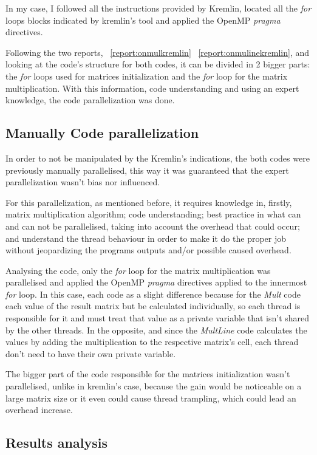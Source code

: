 In my case, I followed all the instructions provided by Kremlin, located all the \textit{for} loops blocks indicated by kremlin's tool and applied the OpenMP \textit{pragma} directives. 

Following the two reports, ~\ref{report:onmulkremlin} ~\ref{report:onmulinekremlin}, and looking at the code's structure for both codes, it can be divided in 2 bigger parts: the \textit{for} loops used for matrices initialization and the \textit{for} loop for the matrix multiplication. With this information, code understanding and using an expert knowledge, the code parallelization was done.


\subsection{Manually Code parallelization}

In order to not be manipulated by the Kremlin's indications, the both codes were previously manually parallelised, this way it was guaranteed that the expert parallelization wasn't bias nor influenced.

For this parallelization, as mentioned before, it requires knowledge in, firstly, matrix multiplication algorithm; code understanding; best practice in what can and can not be parallelised, taking into account the overhead that could occur; and understand the thread behaviour in order to make it do the proper job without jeopardizing the programs outputs and/or possible caused overhead.  

Analysing the code, only the \textit{for} loop for the matrix multiplication was parallelised and applied the OpenMP \textit{pragma} directives applied to the innermost \textit{for} loop. In this case, each code as a slight difference because for the \textit{Mult} code each value of the result matrix but be calculated individually, so each thread is responsible for it and must treat that value as a private variable that isn't shared by the other threads. In the opposite, and since the \textit{MultLine} code calculates the values by adding the multiplication to the respective matrix's cell, each thread don't need to have their own private variable.

The bigger part of the code responsible for the matrices initialization wasn't parallelised, unlike in kremlin's case, because the gain would be noticeable on a large matrix size or it even could cause thread trampling, which could lead an overhead increase. 


\subsection{Results analysis}

